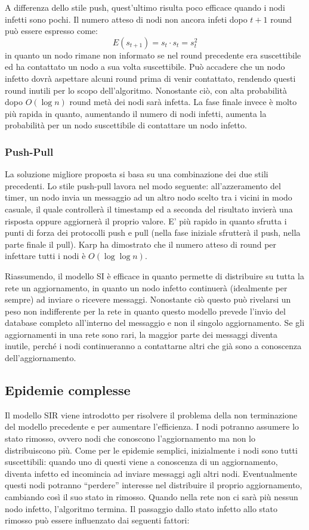 A differenza dello stile push, quest'ultimo risulta poco efficace quando i nodi infetti sono pochi. Il numero atteso di nodi non ancora infeti dopo $t+1$ round può essere espresso come:
\begin{equation}
    E(s_{t+1}) = s_t \cdot s_t = s_t^2
\end{equation}
in quanto un nodo rimane non informato se nel round precedente era suscettibile ed ha contattato un nodo a sua volta suscettibile. Può accadere che un nodo infetto dovrà aspettare alcuni round prima di venir contattato, rendendo questi round inutili per lo scopo dell'algoritmo. Nonostante ciò, con alta probabilità dopo $O(\log n)$ round metà dei nodi sarà infetta. La fase finale invece è molto più rapida in quanto, aumentando il numero di nodi infetti, aumenta la probabilità per un nodo suscettibile di contattare un nodo infetto.
\subsubsection{Push-Pull}
La soluzione migliore proposta si basa su una combinazione dei due stili precedenti. Lo stile push-pull lavora nel modo seguente: all’azzeramento del timer, un nodo invia un messaggio ad un altro nodo scelto tra i vicini in modo casuale, il quale controllerà il timestamp ed a seconda del risultato invierà una risposta oppure aggiornerà il proprio valore. E’ più rapido in quanto sfrutta i punti di forza dei protocolli push e pull (nella fase iniziale sfrutterà il push, nella parte finale il pull). Karp \cite{karp} ha dimostrato che il numero atteso di round per infettare tutti i nodi è $O(\log\log n)$.

Riassumendo, il modello SI è efficace in quanto permette di distribuire su tutta la rete un aggiornamento, in quanto un nodo infetto continuerà (idealmente per sempre) ad inviare o ricevere messaggi. Nonostante ciò questo può rivelarsi un peso non indifferente per la rete in quanto questo modello prevede l’invio del database completo all’interno del messaggio e non il singolo aggiornamento. Se gli aggiornamenti in una rete sono rari, la maggior parte dei messaggi diventa inutile, perché i nodi continueranno a contattarne altri che già sono a conoscenza  dell’aggiornamento. 
\subsection{Epidemie complesse}

Il modello SIR viene introdotto per risolvere il problema della non terminazione del modello precedente e per aumentare l’efficienza. I nodi potranno assumere lo stato rimosso, ovvero nodi che conoscono l’aggiornamento ma non lo distribuiscono più.
Come per le epidemie semplici, inizialmente i nodi sono tutti suscettibili: quando uno di questi viene a conoscenza di un aggiornamento, diventa infetto ed incomincia ad inviare messaggi agli altri nodi. Eventualmente questi nodi potranno “perdere” interesse nel distribuire il proprio aggiornamento, cambiando così il suo stato in rimosso.
Quando nella rete non ci sarà più nessun nodo infetto, l’algoritmo termina.
Il passaggio dallo stato infetto allo stato rimosso può essere influenzato dai seguenti fattori:

